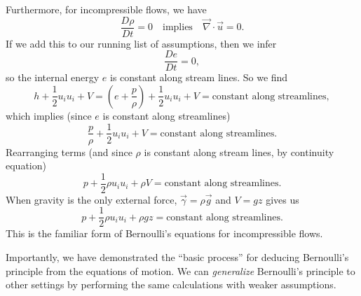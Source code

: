\begin{node}
Furthermore, for incompressible flows, we have
\begin{equation}
\frac{D\rho}{Dt}=0\quad\mbox{implies}\quad\vec{\nabla}\cdot\vec{u}=0.
\end{equation}
If we add this to our running list of assumptions, then we infer
\begin{equation}
\frac{De}{Dt}=0,
\end{equation}
so the internal energy $e$ is constant along stream lines. So we find
\begin{equation}
h + \frac{1}{2}u_{i}u_{i}+V=\left(e +
\frac{p}{\rho}\right)+\frac{1}{2}u_{i}u_{i}+V=\mbox{constant along streamlines},
\end{equation}
which implies (since $e$ is constant along streamlines)
\begin{equation}
\frac{p}{\rho}+\frac{1}{2}u_{i}u_{i}+V=\mbox{constant along streamlines}.
\end{equation}
Rearranging terms (and since $\rho$ is constant along stream lines, by
continuity equation)
\begin{equation}
p+\frac{1}{2}\rho u_{i}u_{i}+\rho V=\mbox{constant along streamlines}.
\end{equation}
When gravity is the only external force, $\vec{\gamma}=\rho\vec{g}$
and $V=gz$ gives us
\begin{equation}
p+\frac{1}{2}\rho u_{i}u_{i}+\rho gz=\mbox{constant along streamlines}.
\end{equation}
This is the familiar form of Bernoulli's equations for incompressible flows.
\end{node}

\begin{remark}
Importantly, we have demonstrated the ``basic process'' for deducing
Bernoulli's principle from the equations of motion. We can
\emph{generalize} Bernoulli's principle to other settings by
performing the same calculations with weaker assumptions.
\end{remark}
